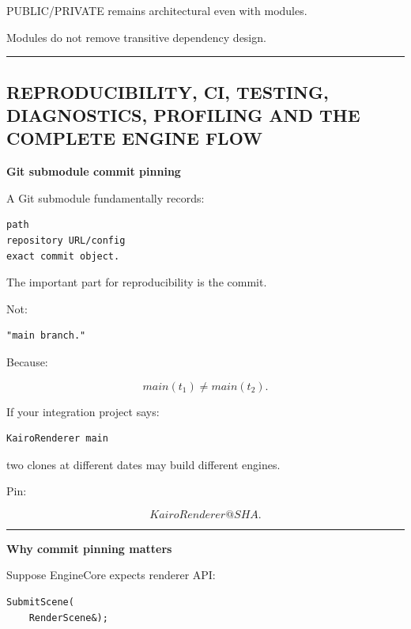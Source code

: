PUBLIC/PRIVATE remains architectural even with modules.

Modules do not remove transitive dependency design.

\begin{center}\rule{0.5\linewidth}{0.5pt}\end{center}

\subsection{REPRODUCIBILITY, CI, TESTING, DIAGNOSTICS, PROFILING AND THE COMPLETE ENGINE FLOW}\label{03-visual-computing-i-ch017-reproducibility-ci-testing-diagnostics-profiling-and-the-complete-engine-flow}

\hypertarget{03-visual-computing-i-ch017-reproducibility-ci-testing-diagnostics-profiling-and-the-complete-engine-flow}{}

\textbf{Git submodule commit pinning}

A Git submodule fundamentally records:

\begin{verbatim}
path
repository URL/config
exact commit object.
\end{verbatim}

The important part for reproducibility is the commit.

Not:

\begin{verbatim}
"main branch."
\end{verbatim}

Because:

\[
main(t_1)
\neq
main(t_2).
\]

If your integration project says:

\begin{verbatim}
KairoRenderer main
\end{verbatim}

two clones at different dates may build different engines.

Pin:

\[
KairoRenderer@SHA.
\]

\begin{center}\rule{0.5\linewidth}{0.5pt}\end{center}

\textbf{Why commit pinning matters}

Suppose EngineCore expects renderer API:

\begin{verbatim}
SubmitScene(
    RenderScene&);
\end{verbatim}

